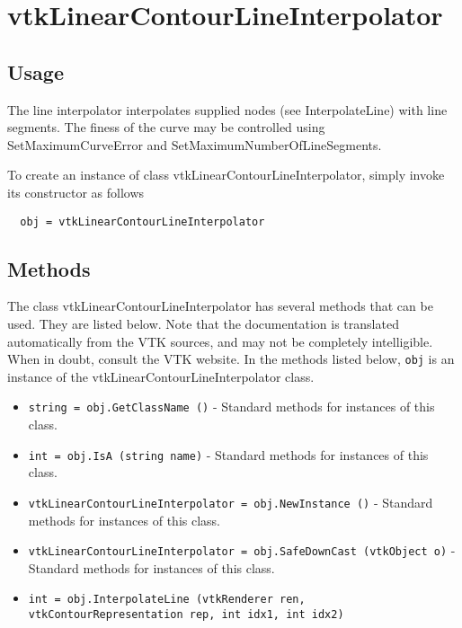 \section{vtkLinearContourLineInterpolator}

\subsection{Usage}

 The line interpolator interpolates supplied nodes (see InterpolateLine)
 with line segments. The finess of the curve may be controlled using
 SetMaximumCurveError and SetMaximumNumberOfLineSegments.


To create an instance of class vtkLinearContourLineInterpolator, simply
invoke its constructor as follows
\begin{verbatim}
  obj = vtkLinearContourLineInterpolator
\end{verbatim}
\subsection{Methods}

The class vtkLinearContourLineInterpolator has several methods that can be used.
  They are listed below.
Note that the documentation is translated automatically from the VTK sources,
and may not be completely intelligible.  When in doubt, consult the VTK website.
In the methods listed below, \verb|obj| is an instance of the vtkLinearContourLineInterpolator class.
\begin{itemize}
\item  \verb|string = obj.GetClassName ()| -  Standard methods for instances of this class.

\item  \verb|int = obj.IsA (string name)| -  Standard methods for instances of this class.

\item  \verb|vtkLinearContourLineInterpolator = obj.NewInstance ()| -  Standard methods for instances of this class.

\item  \verb|vtkLinearContourLineInterpolator = obj.SafeDownCast (vtkObject o)| -  Standard methods for instances of this class.

\item  \verb|int = obj.InterpolateLine (vtkRenderer ren, vtkContourRepresentation rep, int idx1, int idx2)|

\end{itemize}
